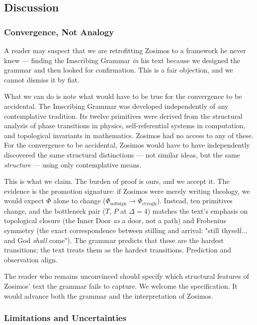\documentclass[12pt,a4paper]{article}
\begin{document}
\subsection{Discussion}

\subsubsection{Convergence, Not Analogy}

A reader may suspect that we are retrofitting Zosimos to a framework he never knew --- finding the Imscribing Grammar \emph{in} his text because we designed the grammar and then looked for confirmation. This is a fair objection, and we cannot dismiss it by fiat.

What we can do is note what would have to be true for the convergence to be accidental. The Imscribing Grammar was developed independently of any contemplative tradition. Its twelve primitives were derived from the structural analysis of phase transitions in physics, self-referential systems in computation, and topological invariants in mathematics. Zosimos had no access to any of these. For the convergence to be accidental, Zosimos would have to have independently discovered the same structural distinctions --- not similar ideas, but the same \emph{structure} --- using only contemplative means.

This is what we claim. The burden of proof is ours, and we accept it. The evidence is the promotion signature: if Zosimos were merely writing theology, we would expect $\Phi$ alone to change ($\Phi_{\text{softsign}} \to \Phi_{\text{ctyogh}}$). Instead, ten primitives change, and the bottleneck pair ($T$, $P$ at $\Delta = 4$) matches the text's emphasis on topological closure (the Inner Door \emph{as} a door, not a path) and Frobenius symmetry (the exact correspondence between stilling and arrival: "still thyself... and God \emph{shall} come"). The grammar predicts that these are the hardest transitions; the text treats them as the hardest transitions. Prediction and observation align.

The reader who remains unconvinced should specify which structural features of Zosimos' text the grammar fails to capture. We welcome the specification. It would advance both the grammar and the interpretation of Zosimos.

\subsubsection{Limitations and Uncertainties}
\end{document}
